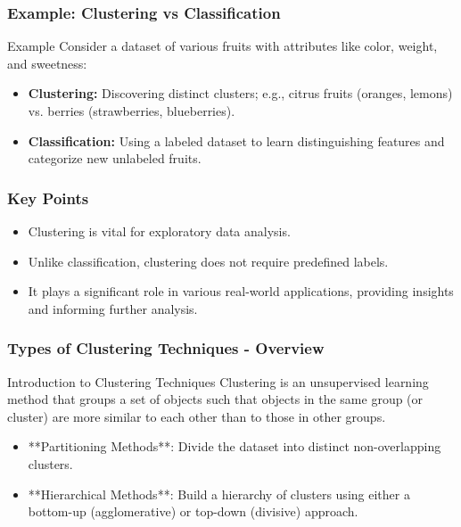 \documentclass{beamer}
\begin{document}
\begin{frame}[fragile]
    \frametitle{Example: Clustering vs Classification}
    \begin{block}{Example}
        Consider a dataset of various fruits with attributes like color, weight, and sweetness:
        
        \begin{itemize}
            \item \textbf{Clustering:} Discovering distinct clusters; e.g., citrus fruits (oranges, lemons) vs. berries (strawberries, blueberries).
            \item \textbf{Classification:} Using a labeled dataset to learn distinguishing features and categorize new unlabeled fruits.
        \end{itemize}
    \end{block}
\end{frame}

\begin{frame}[fragile]
    \frametitle{Key Points}
    \begin{itemize}
        \item Clustering is vital for exploratory data analysis.
        \item Unlike classification, clustering does not require predefined labels.
        \item It plays a significant role in various real-world applications, providing insights and informing further analysis.
    \end{itemize}
\end{frame}

\begin{frame}[fragile]
    \frametitle{Types of Clustering Techniques - Overview}
    \begin{block}{Introduction to Clustering Techniques}
        Clustering is an unsupervised learning method that groups a set of objects such that objects in the same group (or cluster) are more similar to each other than to those in other groups. 
    \end{block}
    
    \begin{itemize}
        \item **Partitioning Methods**: Divide the dataset into distinct non-overlapping clusters.
        \item **Hierarchical Methods**: Build a hierarchy of clusters using either a bottom-up (agglomerative) or top-down (divisive) approach.
    \end{itemize}
\end{frame}
\end{document}
